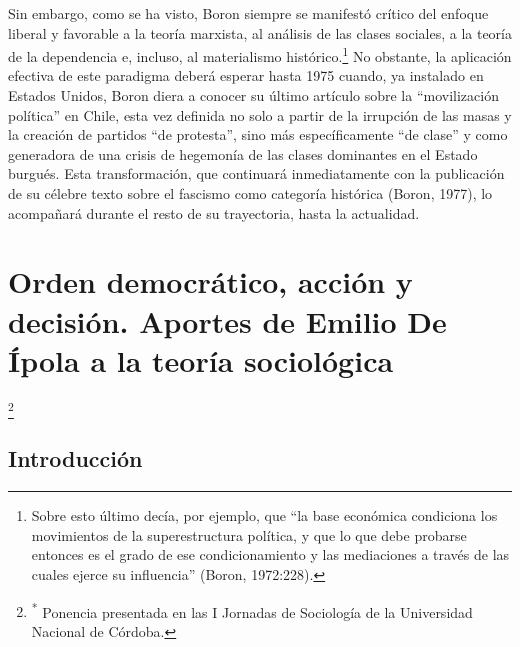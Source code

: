 Sin embargo, como se ha visto, Boron siempre se manifestó crítico del enfoque liberal y favorable a la teoría marxista, al análisis de las clases sociales, a la teoría de la dependencia e, incluso, al materialismo histórico.\footnote{Sobre esto último decía, por ejemplo, que \enquote{la base económica condiciona los movimientos de la superestructura política, y que lo que debe probarse entonces es el grado de ese condicionamiento y las mediaciones a través de las cuales ejerce su influencia} (Boron, 1972:228).} No obstante, la aplicación efectiva de este paradigma deberá esperar hasta 1975 cuando, ya instalado en Estados Unidos, Boron diera a conocer su último artículo sobre la \enquote{movilización política} en Chile, esta vez definida no solo a partir de la irrupción de las masas y la creación de partidos \enquote{de protesta}, sino más específicamente \enquote{de clase} y como generadora de una crisis de hegemonía de las clases dominantes en el Estado burgués. Esta transformación, que continuará inmediatamente con la publicación de su célebre texto sobre el fascismo como categoría histórica (Boron, 1977), lo acompañará durante el resto de su trayectoria, hasta la actualidad.

\chapter{Orden democrático, acción y decisión. Aportes de Emilio De Ípola a la teoría sociológica}

\footnote{\textsuperscript{*} Ponencia presentada en las I Jornadas de Sociología de la Universidad Nacional de Córdoba.}

\section{Introducción}

